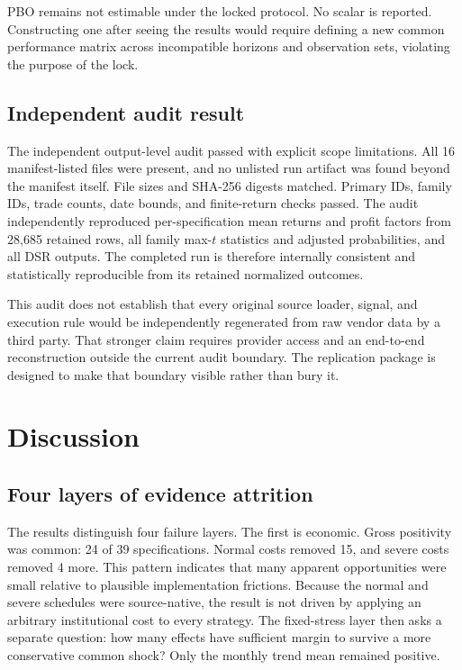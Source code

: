 PBO remains not estimable under the locked protocol. No scalar is reported. Constructing one after seeing the results would require defining a new common performance matrix across incompatible horizons and observation sets, violating the purpose of the lock.

\subsection{Independent audit result}\label{subsec:audit_result}

The independent output-level audit passed with explicit scope limitations. All 16 manifest-listed files were present, and no unlisted run artifact was found beyond the manifest itself. File sizes and SHA-256 digests matched. Primary IDs, family IDs, trade counts, date bounds, and finite-return checks passed. The audit independently reproduced per-specification mean returns and profit factors from 28,685 retained rows, all family max-$t$ statistics and adjusted probabilities, and all DSR outputs. The completed run is therefore internally consistent and statistically reproducible from its retained normalized outcomes.

This audit does not establish that every original source loader, signal, and execution rule would be independently regenerated from raw vendor data by a third party. That stronger claim requires provider access and an end-to-end reconstruction outside the current audit boundary. The replication package is designed to make that boundary visible rather than bury it.

\section{Discussion}\label{sec:discussion}

\subsection{Four layers of evidence attrition}

The results distinguish four failure layers. The first is economic. Gross positivity was common: 24 of 39 specifications. Normal costs removed 15, and severe costs removed 4 more. This pattern indicates that many apparent opportunities were small relative to plausible implementation frictions. Because the normal and severe schedules were source-native, the result is not driven by applying an arbitrary institutional cost to every strategy. The fixed-stress layer then asks a separate question: how many effects have sufficient margin to survive a more conservative common shock? Only the monthly trend mean remained positive.

